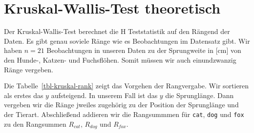 \documentclass[
  letterpaper,
  DIV=11,
  oneside]{scrreport}
\begin{document}
\hypertarget{kruskal-wallis-test-theoretisch}{%
\section{Kruskal-Wallis-Test
theoretisch}\label{kruskal-wallis-test-theoretisch}}

Der Kruskal-Wallis-Test berechnet die H Teststatistik auf den Rängend
der Daten. Es gibt genau soviele Ränge wie es Beobachtungen im Datensatz
gibt. Wir haben \(n = 21\) Beobachtungen in unseren Daten zu der
Sprungweite in {[}cm{]} von den Hunde-, Katzen- und Fuchsflöhen. Somit
müssen wir auch einundzwanzig Ränge vergeben.

Die Tabelle~\ref{tbl-kruskal-rank} zeigt das Vorgehen der Rangvergabe.
Wir sortieren als erstes das \(y\) aufsteigend. In unserem Fall ist das
\(y\) die Sprunglänge. Dann vergeben wir die Ränge jweiles zugehörig zu
der Position der Sprunglänge und der Tierart. Abschließend addieren wir
die Rangsummmen für \texttt{cat}, \texttt{dog} und \texttt{fox} zu den
Rangsummen \(R_{cat}\), \(R_{dog}\) und \(R_{fox}\).
\end{document}
